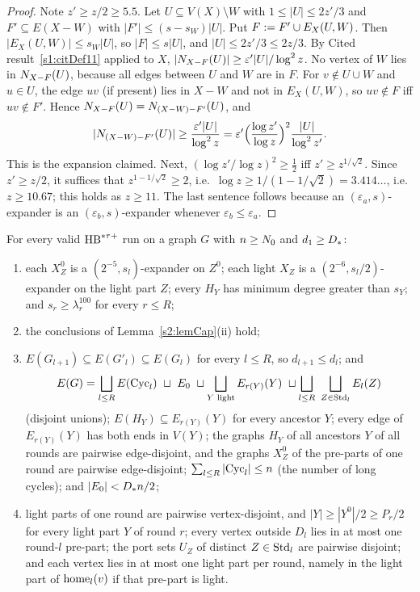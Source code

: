 \begin{proof}
Note $z'\ge z/2\ge5.5$. Let $U\subseteq V(X)\setminus W$ with $1\le|U|\le2z'/3$
and $F'\subseteq E(X-W)$ with $|F'|\le(s-s_W)|U|$. Put $F\mathrel{:=} F'\cup
E_X(U,W)$. Then $|E_X(U,W)|\le s_W|U|$, so $|F|\le s|U|$, and $|U|\le2z'/3\le
2z/3$. By Cited result~\ref{s1:citDef11} applied to $X$,
$|N_{X-F}(U)|\ge\varepsilon'|U|/\log^2z$. No vertex of $W$ lies in
$N_{X-F}(U)$, because all edges between $U$ and $W$ are in $F$. For
$v\notin U\cup W$ and $u\in U$, the edge $uv$ (if present) lies in $X-W$ and not
in $E_X(U,W)$, so $uv\notin F$ iff $uv\notin F'$. Hence
$N_{X-F}(U)=N_{(X-W)-F'}(U)$, and
\[
|N_{(X-W)-F'}(U)|\ge\frac{\varepsilon'|U|}{\log^2z}
=\varepsilon'\Bigl(\frac{\log z'}{\log z}\Bigr)^2\frac{|U|}{\log^2z'}.
\]
This is the expansion claimed. Next, $(\log z'/\log z)^2\ge\frac12$ iff $z'\ge
z^{1/\sqrt2}$. Since $z'\ge z/2$, it suffices that $z^{1-1/\sqrt2}\ge2$, i.e.\
$\log z\ge1/(1-1/\sqrt2)=3.414\ldots$, i.e.\ $z\ge10.67$; this holds as $z\ge11$.
The last sentence follows because an $(\varepsilon_a,s)$-expander is an
$(\varepsilon_b,s)$-expander whenever $\varepsilon_b\le\varepsilon_a$.
\end{proof}

\begin{proposition}[structure of a valid run]\label{s2:propStructure}
For every valid $\mathrm{HB}^{*\tau{+}}$ run on a graph $G$ with $n\ge N_{0}$ and $d_1\ge D_{*}$:
\begin{enumerate}
\item[(i)] each $X^0_Z$ is a $(2^{-5},s_l)$-expander on $Z^0$; each light $X_Z$
is a $(2^{-6},s_l/2)$-expander on the light part $Z$; every $H_Y$ has minimum
degree greater than $s_Y$; and $s_r\ge\lambda_r^{100}$ for every $r\le R$;
\item[(ii)] the conclusions of Lemma~\ref{s2:lemCap}(ii) hold;
\item[(iii)] $E(G_{l+1})\subseteq E(G'_l)\subseteq E(G_l)$ for every $l\le R$,
so $d_{l+1}\le d_l$; and
\[
E(G)=\bigsqcup_{l\le R}E(\Cyc_l)\ \sqcup\ E_0\ \sqcup
\bigsqcup_{Y\text{ light}}E_{r(Y)}(Y)\ \sqcup\bigsqcup_{l\le R}\
\bigsqcup_{Z\in\Std_l}E_l(Z)
\]
(disjoint unions); $E(H_Y)\subseteq E_{r(Y)}(Y)$ for every ancestor $Y$; every
edge of $E_{r(Y)}(Y)$ has both ends in $V(Y)$; the graphs $H_Y$ of all
ancestors $Y$ of all rounds are pairwise edge-disjoint, and the graphs $X^0_Z$
of the pre-parts of one round are pairwise edge-disjoint; $\sum_{l\le
R}|\mathrm{Cyc}_l|\le n$ (the number of long cycles); and $|E_0|<D_{*} n/2$;
\item[(iv)] light parts of one round are pairwise vertex-disjoint, and
$|Y|\ge|Y^0|/2\ge P_r/2$ for every light part $Y$ of round $r$; every vertex
outside $D_l$ lies in at most one round-$l$ pre-part; the port sets $U_Z$ of
distinct $Z\in\mathrm{Std}_l$ are pairwise disjoint; and each vertex lies in at most one
light part per round, namely in the light part of $\mathrm{home}_l(v)$ if that
pre-part is light.
\end{enumerate}
\deps{\ref{s2:defHBtp}, \ref{s2:defAncestors}, \ref{s2:lem14tau}, \ref{s2:lemCap}, \ref{s2:lemHS}, \ref{s1:citDef11}, \ref{s1:citLem14}, \ref{s2:lemSEP}, \ref{s1:condG1}}
\end{proposition}

